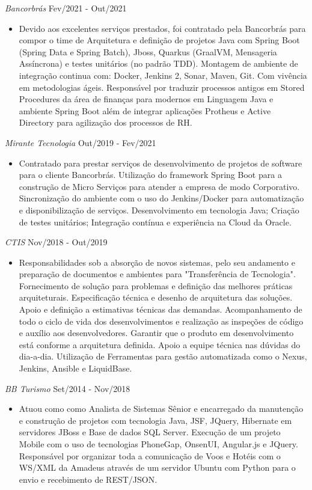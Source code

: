 \documentclass{res}
\begin{document}
\begin{resume}
		{\sl Bancorbrás} \hfill Fev/2021 - Out/2021
		\begin{itemize}
			\item Devido aos excelentes serviços prestados, foi contratado pela Bancorbrás para compor o time de Arquitetura e definição de projetos Java com Spring Boot (Spring Data e Spring Batch), Jboss, Quarkus (GraalVM, Mensageria Assíncrona) e testes unitários (no padrão TDD). Montagem de ambiente de integração continua com: Docker, Jenkins 2, Sonar, Maven, Git. Com vivência em metodologias ágeis. Responsável por traduzir processos antigos em Stored Procedures da área de finanças para modernos em Linguagem Java e ambiente Spring Boot além de integrar aplicações Protheus e Active Directory para agilização dos processos de RH.
		\end{itemize}

		{\sl Mirante Tecnologia} \hfill Out/2019 - Fev/2021
		\begin{itemize}
			\item Contratado para prestar serviços de desenvolvimento de projetos de software para o cliente Bancorbrás. Utilização do framework Spring Boot para a construção de Micro Serviços para atender a empresa de modo Corporativo. Sincronização do ambiente com o uso do Jenkins/Docker para automatização e disponibilização de serviços. Desenvolvimento em tecnologia Java; Criação de testes unitários; Integração contínua e experiência na Cloud da Oracle. 
		\end{itemize}
		
		{\sl CTIS} \hfill Nov/2018 - Out/2019
		\begin{itemize}
			\item Responsabilidades sob a absorção de novos sistemas, pelo seu andamento e preparação de documentos e ambientes para "Transferência de Tecnologia". Fornecimento de solução para problemas e definição das melhores práticas arquiteturais. Especificação técnica e desenho de arquitetura das soluções. Apoio e definição a estimativas técnicas das demandas. Acompanhamento de todo o ciclo de vida dos desenvolvimentos e realização as inspeções de código e auxílio aos desenvolvedores. Garantir que o produto em desenvolvimento está conforme a arquitetura definida. Apoio a equipe técnica nas dúvidas do dia-a-dia. Utilização de Ferramentas para gestão automatizada como o Nexus, Jenkins, Ansible e LiquidBase.
		\end{itemize}
		
		{\sl BB Turismo} \hfill Set/2014 - Nov/2018
		\begin{itemize}
			\item Atuou como como Analista de Sistemas Sênior e encarregado da manutenção e construção de projetos com tecnologia Java, JSF, JQuery, Hibernate em servidores JBoss e Base de dados SQL Server. Execução de um projeto Mobile com o uso de tecnologias PhoneGap, OnsenUI, Angular.js e JQuery. Responsável por organizar toda a comunicação de Voos e Hotéis com o WS/XML da Amadeus através de um servidor Ubuntu com Python para o envio e recebimento de REST/JSON.
		\end{itemize}
		

\end{resume}
\end{document}
